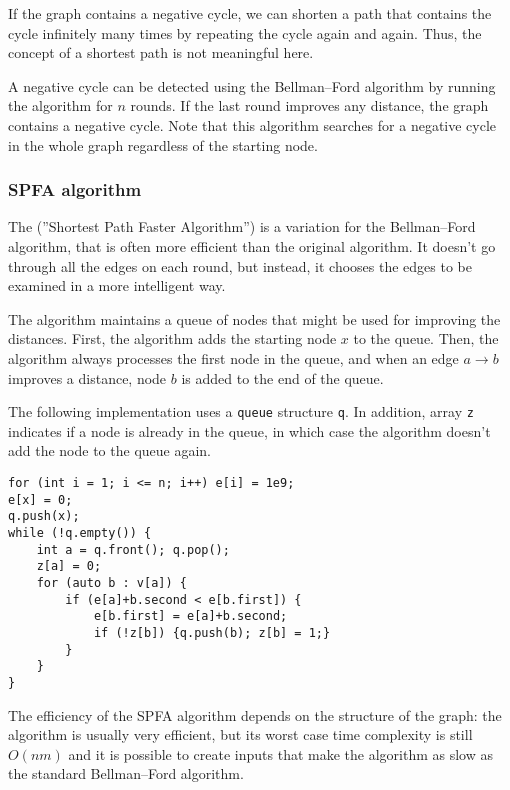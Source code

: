 If the graph contains a negative cycle,
we can shorten a path that contains the cycle
infinitely many times by repeating the cycle
again and again.
Thus, the concept of a shortest path
is not meaningful here.

A negative cycle can be detected
using the Bellman–Ford algorithm by
running the algorithm for $n$ rounds.
If the last round improves any distance,
the graph contains a negative cycle.
Note that this algorithm searches for
a negative cycle in the whole graph
regardless of the starting node.

\subsubsection{SPFA algorithm}


The  (''Shortest Path Faster Algorithm'')
is a variation for the Bellman–Ford algorithm,
that is often more efficient than the original algorithm.
It doesn't go through all the edges on each round,
but instead, it chooses the edges to be examined
in a more intelligent way.

The algorithm maintains a queue of nodes that might
be used for improving the distances.
First, the algorithm adds the starting node $x$
to the queue.
Then, the algorithm always processes the
first node in the queue, and when an edge
$a \rightarrow b$ improves a distance,
node $b$ is added to the end of the queue.

The following implementation uses a
\texttt{queue} structure \texttt{q}.
In addition, array \texttt{z} indicates
if a node is already in the queue,
in which case the algorithm doesn't add
the node to the queue again.

\begin{lstlisting}
for (int i = 1; i <= n; i++) e[i] = 1e9;
e[x] = 0;
q.push(x);
while (!q.empty()) {
    int a = q.front(); q.pop();
    z[a] = 0;
    for (auto b : v[a]) {
        if (e[a]+b.second < e[b.first]) {
            e[b.first] = e[a]+b.second;
            if (!z[b]) {q.push(b); z[b] = 1;}
        }
    }
}
\end{lstlisting}

The efficiency of the SPFA algorithm depends
on the structure of the graph:
the algorithm is usually very efficient,
but its worst case time complexity is still
$O(nm)$ and it is possible to create inputs
that make the algorithm as slow as the
standard Bellman–Ford algorithm.

